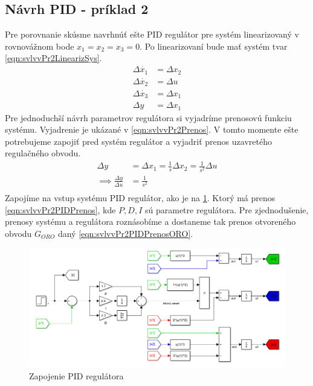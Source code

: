 \documentclass[../main.tex]{subfiles}
\begin{document}
	\subsection*{Návrh PID - príklad 2}		
	Pre porovnanie skúsme navrhnúť ešte PID regulátor pre systém linearizovaný v rovnovážnom bode $x_1 = x_2 = x_3 = 0$. Po linearizovaní bude mať systém tvar \cref{eqn:svlvvPr2LinearizSys}. 
	\begin{equation}
	\begin{aligned}
	\Delta \dot{x_1}  &= \Delta x_2 \\
	\Delta \dot{x_2} &= \Delta u \\
	\Delta \dot{x_3} &= \Delta x_1 \\
	\Delta y &= \Delta  x_1
	\end{aligned}
	\label{eqn:svlvvPr2LinearizSys}
	\end{equation}	
	Pre jednoduchší návrh parametrov regulátora si vyjadríme prenosovú funkciu systému. Vyjadrenie je ukázané v \cref{eqn:svlvvPr2Prenos}. V tomto momente ešte potrebujeme zapojiť pred systém regulátor a vyjadriť prenos uzavretého regulačného obvodu.
	\begin{equation}
	\begin{aligned}
	\Delta  y &= \Delta x_1 = \frac{1}{s}  \Delta x_2 = \frac{1}{s^2}  \Delta u \\
	\implies \frac{\Delta y}{\Delta u } &= \frac{1}{s^2} \\
	\end{aligned}
	\label{eqn:svlvvPr2Prenos}
	\end{equation}
	Zapojíme na vstup systému PID regulátor, ako je na \cref{fig:svlvvPr2ZapPID}. Ktorý má prenos \cref{eqn:svlvvPr2PIDPrenos}, kde $P, D, I$ sú parametre regulátora. Pre zjednodušenie, prenosy systému a regulátora roznásobíme a dostaneme tak prenos otvoreného obvodu $G_{ORO}$ daný \cref{eqn:svlvvPr2PIDPrenosORO}. 
	\begin{figure}[h!]
		\centering
		\includegraphics[width=0.8\linewidth]{svlvvPr2ZapPID}
		\caption{Zapojenie PID regulátora}
		\label{fig:svlvvPr2ZapPID}
	\end{figure}
\end{document}
